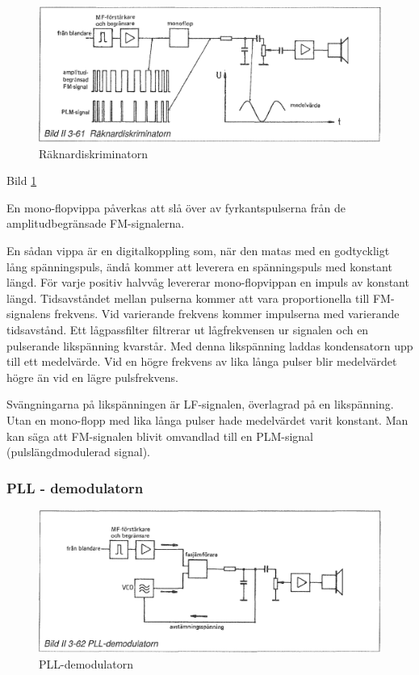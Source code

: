 \begin{figure}
\includegraphics[width=\textwidth]{images/bild_2_3-61}
\caption{Räknardiskriminatorn}
\label{fig:BildII3-61}
\end{figure}

Bild \ref{fig:BildII3-61}

En mono-flopvippa påverkas att slå över av fyrkantspulserna från de
amplitudbegränsade FM-signalerna.

En sådan vippa är en digitalkoppling som, när den matas med en
godtyckligt lång spänningspuls, ändå kommer att leverera en
spänningspuls med konstant längd. För varje positiv halvvåg levererar
mono-flopvippan en impuls av konstant längd. Tidsavståndet mellan
pulserna kommer att vara proportionella till FM-signalens
frekvens. Vid varierande frekvens kommer impulserna med varierande
tidsavstånd. Ett lågpassfilter filtrerar ut lågfrekvensen ur signalen
och en pulserande likspänning kvarstår. Med denna likspänning laddas
kondensatorn upp till ett medelvärde. Vid en högre frekvens av lika
långa pulser blir medelvärdet högre än vid en lägre pulsfrekvens.

Svängningarna på likspänningen är LF-signalen, överlagrad på en
likspänning. Utan en mono-flopp med lika långa pulser hade medelvärdet
varit konstant. Man kan säga att FM-signalen blivit omvandlad till en
PLM-signal (pulslängdmodulerad signal).

\subsubsection{PLL - demodulatorn}

\begin{figure}
\includegraphics[width=\textwidth]{images/bild_2_3-62}
\caption{PLL-demodulatorn}
\label{fig:BildII3-62}
\end{figure}

